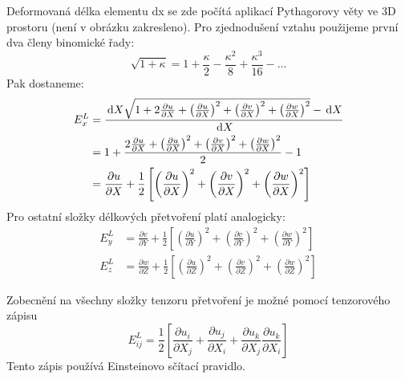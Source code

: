 Deformovaná délka elementu dx se zde počítá aplikací Pythagorovy věty ve 3D prostoru (není v obrázku zakresleno). Pro zjednodušení vztahu použijeme první dva členy binomické řady:
\begin{equation}
	\sqrt{1 + \kappa} = 1 + \frac{\kappa}{2} - \frac{\kappa^2}{8} + \frac{\kappa^3}{16} - \ldots
\end{equation}
Pak dostaneme:
\begin{equation}\begin{split}
	E^L_x
	&= \frac{\,\mathrm{d} X \sqrt{ 1 + 2 \frac{\partial u}{\partial X} + \left( \frac{\partial u}{\partial X} \right)^2 + \left( \frac{\partial v}{\partial X} \right)^2 + \left( \frac{\partial w}{\partial X} \right)^2} - \,\mathrm{d} X}{\,\mathrm{d} X}\\
	&= 1 + \frac{2 \frac{\partial u}{\partial X} + \left( \frac{\partial u}{\partial X} \right)^2 + \left( \frac{\partial v}{\partial X} \right)^2 + \left( \frac{\partial w}{\partial X} \right)^2}{2} - 1\\
	&= \frac{\partial u}{\partial X} + \frac{1}{2} \left[ \left( \frac{\partial u}{\partial X} \right)^2 + \left( \frac{\partial v}{\partial X} \right)^2 + \left( \frac{\partial w}{\partial X} \right)^2 \right]
\end{split}\end{equation}
Pro ostatní složky délkových přetvoření platí analogicky:
\begin{equation}\begin{split}
	E^L_y
	&= \frac{\partial v}{\partial Y} + \frac{1}{2} \left[ \left( \frac{\partial u}{\partial Y} \right)^2 + \left( \frac{\partial v}{\partial Y} \right)^2 + \left( \frac{\partial w}{\partial Y} \right)^2 \right]\\
	E^L_z
	&= \frac{\partial w}{\partial Z} + \frac{1}{2} \left[ \left( \frac{\partial u}{\partial Z} \right)^2 + \left( \frac{\partial v}{\partial Z} \right)^2 + \left( \frac{\partial w}{\partial Z} \right)^2 \right]
\end{split}\end{equation}

Zobecnění na všechny složky tenzoru přetvoření je možné pomocí tenzorového zápisu
\begin{equation}
	E^L_{ij}
	= \frac{1}{2} \left[ \frac{\partial u_i}{\partial X_j} + \frac{\partial u_j}{\partial X_i} + \frac{\partial u_k}{\partial X_j} \frac{\partial u_k}{\partial X_i} \right]
\end{equation}
Tento zápis používá Einsteinovo sčítací pravidlo.

